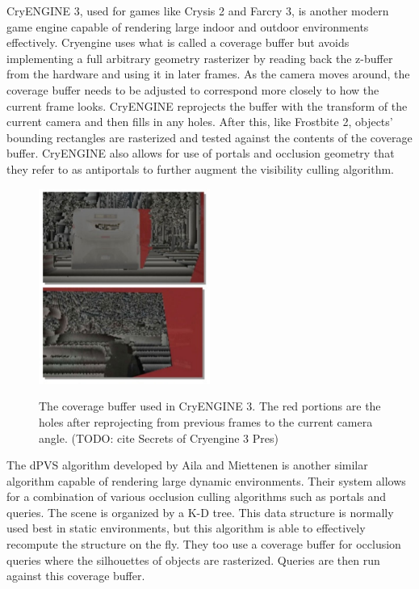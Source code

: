 \documentclass[12pt]{ucthesis}
\newcommand{\captionfonts}{\small\bf\ssp}
\begin{document}
CryENGINE 3, used for games like Crysis 2 and Farcry 3, is another modern game engine capable of rendering large indoor and outdoor environments effectively.\cite{cryengine3, Cryengine-culling-explained}
Cryengine uses what is called a coverage buffer but avoids implementing a full arbitrary geometry rasterizer by reading back the z-buffer from the hardware and using it in later frames.
As the camera moves around, the coverage buffer needs to be adjusted to correspond more closely to how the current frame looks.
CryENGINE reprojects the buffer with the transform of the current camera and then fills in any holes.
After this, like Frostbite 2, objects' bounding rectangles are rasterized and tested against the contents of the coverage buffer.
CryENGINE also allows for use of portals and occlusion geometry that they refer to as antiportals to further augment the visibility culling algorithm.

\begin{figure}
\begin{center}
\includegraphics[width=0.5\textwidth]{Images/CryCoverage.jpg}
\captionfonts
\caption[Cry Engine Coverage Buffer]{The coverage buffer used in CryENGINE 3.  The red portions are the holes after reprojecting from previous frames to the current camera angle. (TODO: cite Secrets of Cryengine 3 Pres)}
\label{fig:cry-coverage}
\end{center}
\end{figure}

The dPVS algorithm developed by Aila and Miettenen is another similar algorithm capable of rendering large dynamic environments.\cite{dpvs}
Their system allows for a combination of various occlusion culling algorithms such as portals and queries.
The scene is organized by a K-D tree.
This data structure is normally used best in static environments, but this algorithm is able to effectively recompute the structure on the fly.
They too use a coverage buffer for occlusion queries where the silhouettes of objects are rasterized.
Queries are then run against this coverage buffer.
\end{document}
